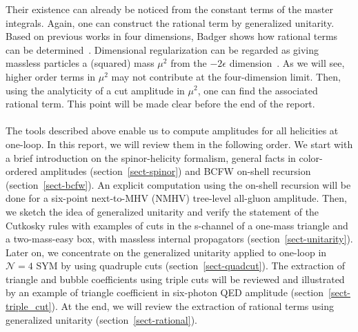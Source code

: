 Their existence can already be noticed from the constant terms of the master integrals.
Again, one can construct the rational term by generalized unitarity. 
Based on previous works in four dimensions, Badger shows how rational terms can be determined~\cite{Badger:2008cm}.
Dimensional regularization can be regarded as giving massless particles a (squared) mass $\mu^2$ from the $-2\epsilon$ dimension~\cite{Bern:1995db}.
As we will see, higher order terms in $\mu^2$ may not contribute at the four-dimension limit.
Then, using the analyticity of a cut amplitude in $\mu^2$, one can find the associated rational term.
This point will be made clear before the end of the report.
\\\\
The tools described above enable us to compute amplitudes for all helicities at one-loop.
In this report, we will review them in the following order.
We start with a brief introduction on the spinor-helicity formalism, general facts in color-ordered amplitudes (section~\ref{sect-spinor}) and BCFW on-shell recursion (section~\ref{sect-bcfw}).
An explicit computation using the on-shell recursion will be done for a six-point next-to-MHV (NMHV) tree-level all-gluon amplitude. 
Then, we sketch the idea of generalized unitarity and verify the statement of the Cutkosky rules with examples of cuts in the s-channel of a one-mass triangle and a two-mass-easy box, with massless internal propagators (section~\ref{sect-unitarity}).
Later on, we concentrate on the generalized unitarity applied to one-loop in $\mathcal{N}=4$ SYM by using quadruple cuts (section~\ref{sect-quadcut}).
The extraction of triangle and bubble coefficients using triple cuts will be reviewed and illustrated by an example of triangle coefficient in six-photon QED amplitude (section~\ref{sect-triple_cut}).
At the end, we will review the extraction of rational terms using generalized unitarity (section~\ref{sect-rational}).
%
